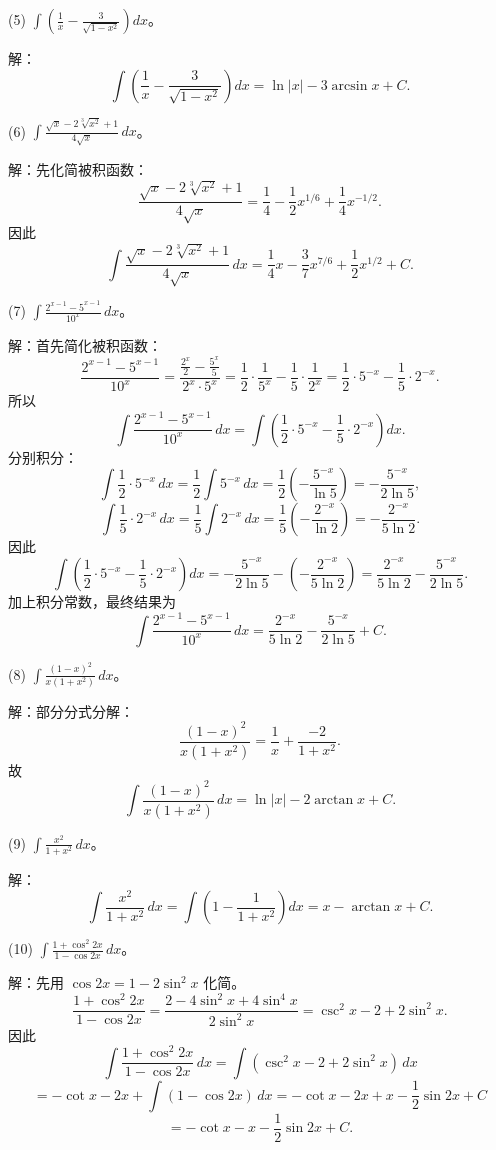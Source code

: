 (5) \(\int\left(\frac{1}{x}-\frac{3}{\sqrt{1-x^{2}}}\right)dx\)。

解：
\[ \int\left(\frac{1}{x}-\frac{3}{\sqrt{1-x^{2}}}\right)dx=\ln|x|-3\arcsin x+C. \]

(6) \(\int\frac{\sqrt{x}-2\sqrt[3]{x^{2}}+1}{4\sqrt{x}}\,dx\)。

解：先化简被积函数：
\[ \frac{\sqrt{x}-2\sqrt[3]{x^{2}}+1}{4\sqrt{x}}=\frac{1}{4}-\frac{1}{2}x^{1/6}+\frac{1}{4}x^{-1/2}. \]
因此
\[ \int\frac{\sqrt{x}-2\sqrt[3]{x^{2}}+1}{4\sqrt{x}}\,dx=\frac{1}{4}x-\frac{3}{7}x^{7/6}+\frac{1}{2}x^{1/2}+C. \]

(7) \(\int\frac{2^{x-1}-5^{x-1}}{10^{x}}\,dx\)。

解：首先简化被积函数：
\[ \frac{2^{x-1}-5^{x-1}}{10^{x}}=\frac{\frac{2^{x}}{2}-\frac{5^{x}}{5}}{2^{x}\cdot 5^{x}}=\frac{1}{2}\cdot\frac{1}{5^{x}}-\frac{1}{5}\cdot\frac{1}{2^{x}}=\frac{1}{2}\cdot 5^{-x}-\frac{1}{5}\cdot 2^{-x}. \]
所以
\[ \int\frac{2^{x-1}-5^{x-1}}{10^{x}}\,dx=\int\left(\frac{1}{2}\cdot 5^{-x}-\frac{1}{5}\cdot 2^{-x}\right)dx. \]
分别积分：
\[ \int\frac{1}{2}\cdot 5^{-x}\,dx=\frac{1}{2}\int 5^{-x}\,dx=\frac{1}{2}\left(-\frac{5^{-x}}{\ln 5}\right)=-\frac{5^{-x}}{2\ln 5}, \]
\[ \int\frac{1}{5}\cdot 2^{-x}\,dx=\frac{1}{5}\int 2^{-x}\,dx=\frac{1}{5}\left(-\frac{2^{-x}}{\ln 2}\right)=-\frac{2^{-x}}{5\ln 2}. \]
因此
\[ \int\left(\frac{1}{2}\cdot 5^{-x}-\frac{1}{5}\cdot 2^{-x}\right)dx=-\frac{5^{-x}}{2\ln 5}-\left(-\frac{2^{-x}}{5\ln 2}\right)=\frac{2^{-x}}{5\ln 2}-\frac{5^{-x}}{2\ln 5}. \]
加上积分常数，最终结果为
\[ \int\frac{2^{x-1}-5^{x-1}}{10^{x}}\,dx=\frac{2^{-x}}{5\ln 2}-\frac{5^{-x}}{2\ln 5}+C. \]

(8) \(\int\frac{(1-x)^{2}}{x(1+x^{2})}\,dx\)。

解：部分分式分解：
\[ \frac{(1-x)^{2}}{x(1+x^{2})}=\frac{1}{x}+\frac{-2}{1+x^{2}}. \]
故
\[ \int\frac{(1-x)^{2}}{x(1+x^{2})}\,dx=\ln|x|-2\arctan x+C. \]

(9) \(\int\frac{x^{2}}{1+x^{2}}\,dx\)。

解：
\[ \int\frac{x^{2}}{1+x^{2}}\,dx=\int\left(1-\frac{1}{1+x^{2}}\right)dx=x-\arctan x+C. \]

(10) \(\int\frac{1+\cos^{2}2x}{1-\cos 2x}\,dx\)。

解：先用 \(\cos 2x=1-2\sin^{2}x\) 化简。
\[ \frac{1+\cos^{2}2x}{1-\cos 2x}=\frac{2-4\sin^{2}x+4\sin^{4}x}{2\sin^{2}x}=\csc^{2}x-2+2\sin^{2}x. \]
因此
\[ \int\frac{1+\cos^{2}2x}{1-\cos 2x}\,dx=\int(\csc^{2}x-2+2\sin^{2}x)\,dx \]
\[ =-\cot x-2x+\int(1-\cos 2x)\,dx=-\cot x-2x+x-\frac{1}{2}\sin 2x+C \]
\[ =-\cot x-x-\frac{1}{2}\sin 2x+C. \]

